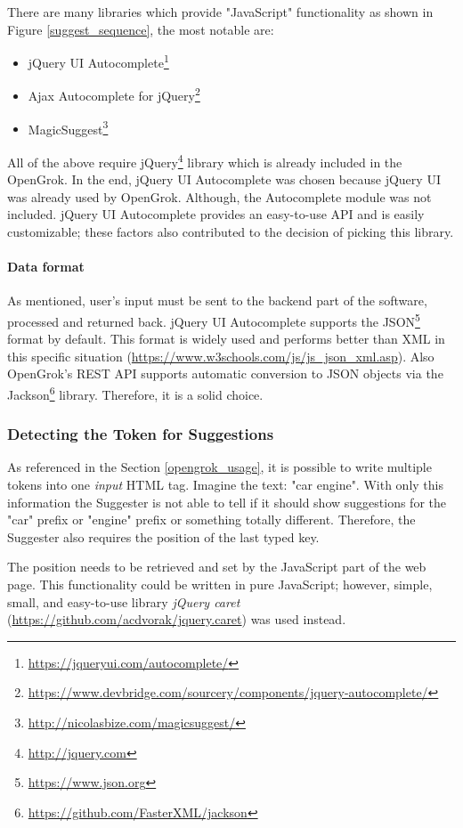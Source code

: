 There are many libraries which provide "JavaScript" functionality as shown in Figure \ref{suggest_sequence},
the most notable are:
\begin{itemize}
    \item jQuery UI Autocomplete\footnote{\url{https://jqueryui.com/autocomplete/}}
    \item Ajax Autocomplete for jQuery\footnote{\url{https://www.devbridge.com/sourcery/components/jquery-autocomplete/}}
    \item MagicSuggest\footnote{\url{http://nicolasbize.com/magicsuggest/}}
\end{itemize}

All of the above require jQuery\footnote{\url{http://jquery.com}} library which is already included in the OpenGrok.
In the end, jQuery UI Autocomplete was chosen because jQuery UI was already used by OpenGrok. Although, the Autocomplete
module was not included. jQuery UI Autocomplete provides an easy-to-use API and is easily customizable; these factors
also contributed to the decision of picking this library.

\paragraph{Data format}
As mentioned, user's input must be sent to the backend part of the software, processed and
returned back. jQuery UI Autocomplete supports the JSON\footnote{\url{https://www.json.org}} format by default. This format
is widely used and performs better than XML in this
specific situation (\url{https://www.w3schools.com/js/js_json_xml.asp}). Also OpenGrok's REST API supports
automatic conversion to JSON objects via the Jackson\footnote{\url{https://github.com/FasterXML/jackson}} library.
Therefore, it is a solid choice.

\subsubsection{Detecting the Token for Suggestions}
As referenced in the Section \ref{opengrok_usage}, it is possible to write multiple tokens into one \textit{input} HTML tag.
Imagine the text: "car engine". With only this information the Suggester is not able to tell if it should show
suggestions for the "car" prefix or "engine" prefix or something totally different. Therefore, the Suggester also requires the position of the last typed
key.

The position needs to be retrieved and set by the JavaScript part of the web page. This functionality could be written in
pure JavaScript; however, simple, small, and easy-to-use library \textit{jQuery caret} (\url{https://github.com/acdvorak/jquery.caret})
was used instead.

